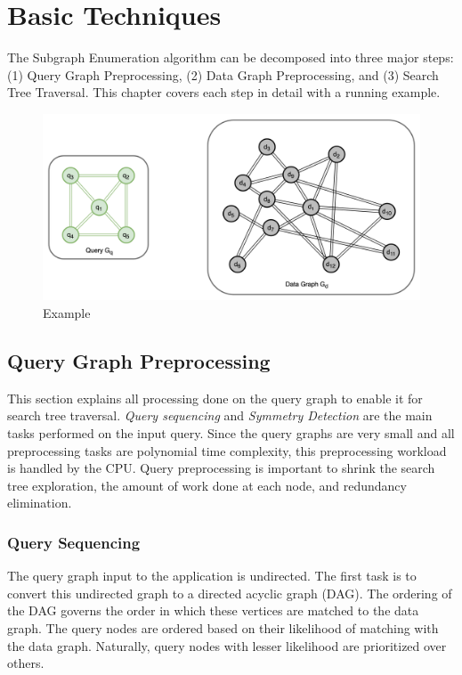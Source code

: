 \chapter{Basic Techniques}\label{chap:basic-theory}

The Subgraph Enumeration algorithm can be decomposed into three major steps: (1) Query Graph Preprocessing, (2) Data Graph Preprocessing, and (3) Search Tree Traversal. This chapter covers each step in detail with a running example.

\begin{figure}
    \includegraphics[width=\textwidth]{fig/LR/sgm-example1.png}
    \caption{Example}
    \label{fig:sgm-example}
\end{figure}
\section{Query Graph Preprocessing}\label{query-preprocessing}
This section explains all processing done on the query graph to enable it for search tree traversal.
\textit{Query sequencing} and \textit{Symmetry Detection} are the main tasks performed on the input query.
Since the query graphs are very small and all preprocessing tasks are polynomial time complexity, this preprocessing workload is handled by the CPU.
Query preprocessing is important to shrink the search tree exploration, the amount of work done at each node, and redundancy elimination.

\subsection{Query Sequencing}
The query graph input to the application is undirected. The first task is to convert this undirected graph to a directed acyclic graph (DAG). The ordering of the DAG governs the order in which these vertices are matched to the data graph.
The query nodes are ordered based on their likelihood of matching with the data graph. Naturally, query nodes with lesser likelihood are prioritized over others.

